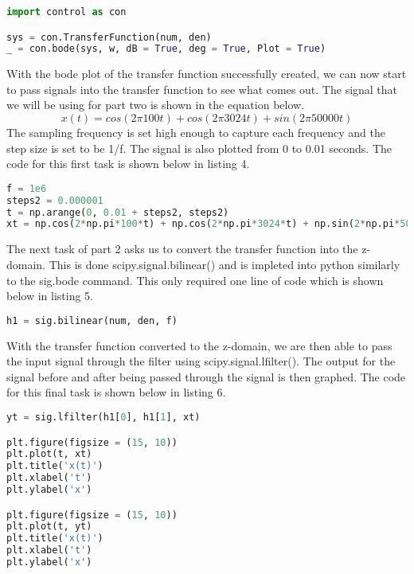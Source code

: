 \documentclass[12pt]{report}
\begin{document}
\begin{lstlisting}[language=Python, caption=Part 1 Task 3 Code]
import control as con

sys = con.TransferFunction(num, den)
_ = con.bode(sys, w, dB = True, deg = True, Plot = True)
\end{lstlisting}
\hspace{\parindent}With the bode plot of the transfer function successfully created, we can now start to pass signals into the transfer function to see what comes out. The signal that we will be using for part two is shown in the equation below.
\[x(t)=cos(2\pi 100t)+cos(2\pi 3024t)+sin(2\pi 50000t)\]
The sampling frequency is set high enough to capture each frequency and the step size is set to be 1/f. The signal is also plotted from 0 to 0.01 seconds. The code for this first task is shown below in listing 4. 
\par
\begin{lstlisting}[language=Python, caption=Part 2 Task 1 Code]
f = 1e6
steps2 = 0.000001
t = np.arange(0, 0.01 + steps2, steps2)
xt = np.cos(2*np.pi*100*t) + np.cos(2*np.pi*3024*t) + np.sin(2*np.pi*50000*t)
\end{lstlisting}
\hspace{\parindent}The next task of part 2 asks us to convert the transfer function into the z-domain. This is done scipy.signal.bilinear() and is impleted into python similarly to the sig.bode command. This only required one line of code which is shown below in listing 5.
\begin{lstlisting}[language=Python, caption=Part 2 Task 2 Code]
h1 = sig.bilinear(num, den, f)
\end{lstlisting}
\hspace{\parindent}With the transfer function converted to the z-domain, we are then able to pass the input signal through the filter using scipy.signal.lfilter(). The output for the signal before and after being passed through the signal is then graphed. The code for this final task is shown below in listing 6.
\begin{lstlisting}[language=Python, caption=Part 2 Task 3 and 4 Code]
yt = sig.lfilter(h1[0], h1[1], xt)

plt.figure(figsize = (15, 10))
plt.plot(t, xt)
plt.title('x(t)')
plt.xlabel('t')
plt.ylabel('x')

plt.figure(figsize = (15, 10))
plt.plot(t, yt)
plt.title('x(t)')
plt.xlabel('t')
plt.ylabel('x')
\end{lstlisting}
\end{document}
